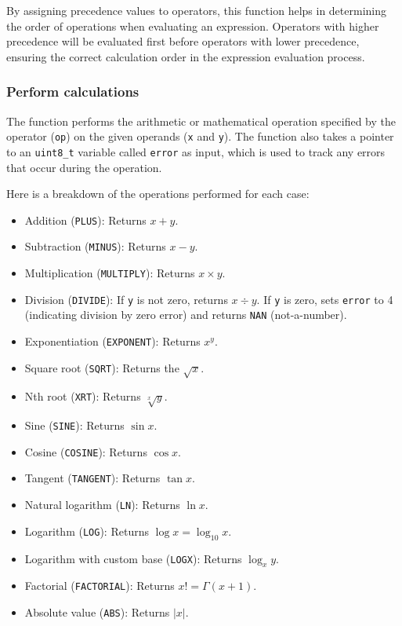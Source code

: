\documentclass[a4paper, twoside]{report}
\begin{document}
By assigning precedence values to operators, this function helps in determining the order of operations when evaluating an expression. Operators with higher precedence will be evaluated first before operators with lower precedence, ensuring the correct calculation order in the expression evaluation process.

\subsubsection{Perform calculations}
The function performs the arithmetic or mathematical operation specified by the operator (\texttt{op}) on the given operands (\texttt{x} and \texttt{y}). The function also takes a pointer to an \texttt{uint8\_t} variable called \texttt{error} as input, which is used to track any errors that occur during the operation.

Here is a breakdown of the operations performed for each case:

\begin{itemize}
    \item Addition (\texttt{PLUS}): Returns $x+y$.
    \item Subtraction (\texttt{MINUS}): Returns $x-y$.
    \item Multiplication (\texttt{MULTIPLY}): Returns $x\times y$.
    \item Division (\texttt{DIVIDE}): If \texttt{y} is not zero, returns $x\div y$. If \texttt{y} is zero, sets \texttt{error} to 4 (indicating division by zero error) and returns \texttt{NAN} (not-a-number).
    \item Exponentiation (\texttt{EXPONENT}): Returns $x^y$.
    \item Square root (\texttt{SQRT}): Returns the $\sqrt x$.
    \item Nth root (\texttt{XRT}): Returns $\sqrt[x] y$.
    \item Sine (\texttt{SINE}): Returns $\sin x$.
    \item Cosine (\texttt{COSINE}): Returns $\cos x$.
    \item Tangent (\texttt{TANGENT}): Returns $\tan x$.
    \item Natural logarithm (\texttt{LN}): Returns $\ln x$.
    \item Logarithm (\texttt{LOG}): Returns $\log x = \log_{10} x$.
    \item Logarithm with custom base (\texttt{LOGX}): Returns $\log_x y$.
    \item Factorial (\texttt{FACTORIAL}): Returns $x! = \Gamma(x+1)$.
    \item Absolute value (\texttt{ABS}): Returns $|x|$.
\end{itemize}
\end{document}
